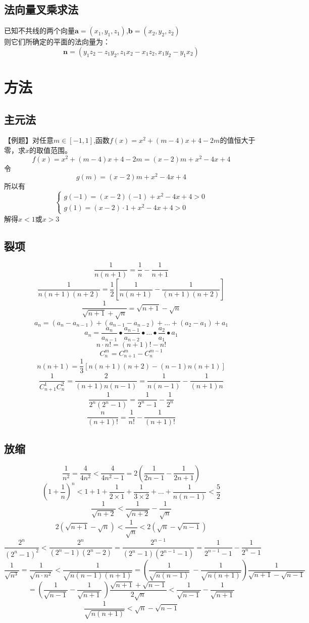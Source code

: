 \documentclass[UTF8]{ctexart}
\begin{document}
		\subsection{法向量叉乘求法}
			已知不共线的两个向量$\boldsymbol{a}=(x_1,y_1,z_1)$,$\boldsymbol{b}=(x_2,y_2,z_2)$\\
			则它们所确定的平面的法向量为：
			\[\boldsymbol{n}=(y_1 z_2-z_1 y_2,z_1 x_2-x_1 z_2,x_1 y_2-y_1 x_2)\]
	\section{方法}
		\subsection{主元法}
			【例题】对任意$m\in [-1,1]$,函数$f(x)=x^2+(m-4)x+4-2m$的值恒大于零，求$x$的取值范围。\\
			\[f(x)=x^2+(m-4)x+4-2m=(x-2)m+x^2-4x+4\]
			令
			\[g(m)=(x-2)m+x^2-4x+4\]
			所以有
			\[\begin{cases}
				g(-1)=(x-2)(-1)+x^2-4x+4>0
				\\
				g(1)=(x-2)\cdot 1+x^2-4x+4>0
			\end{cases}\]
			解得$x<1 $或$ x>3$
		\subsection{裂项}
			\[\frac{1}{n(n+1)}=\frac{1}{n}-\frac{1}{n+1}\]
			\[\frac{1}{n(n+1)(n+2)}=\frac{1}{2}\left[\frac{1}{n(n+1)}-\frac{1}{(n+1)(n+2)}\right] \]
			\[\frac{1}{\sqrt{n+1}+\sqrt{n}}=\sqrt{n+1}-\sqrt{n}\]
			\[a_n=(a_n-a_{n-1})+(a_{n-1}-a_{n-2})+\dots+(a_2-a_1)+a_1\]
			\[a_n=\frac{a_n}{a_{n-1}}\bullet\frac{a_{n-1}}{a_{n-2}}\bullet\dots\bullet\frac{a_2}{a_1}\bullet a_1\]
			\[n\cdot n!=(n+1)!-n!\]
			\[C^{m}_{n}=C^{m}_{n+1}-C^{m-1}_{n}\]
			\[n(n+1)=\frac{1}{3}\left[n(n+1)(n+2)-(n-1)n(n+1)\right]\]
			\[\frac{1}{C^{1}_{n+1}C^{2}_{n}}=\frac{2}{(n+1)n(n-1)}=\frac{1}{n(n-1)}-\frac{1}{(n+1)n}\]
			\[\frac{1}{2^n(2^n-1)}=\frac{1}{2^n-1}-\frac{1}{2^n}\]
			\[\frac{n}{(n+1)!}=\frac{1}{n!}-\frac{1}{(n+1)!}\]
		\subsection{放缩}
			\[\frac{1}{n^2}=\frac{4}{4n^2}<\frac{4}{4n^2 -1}=2\left(\frac{1}{2n-1}-\frac{1}{2n+1}\right)\]
			\[\left(1+\frac{1}{n}\right)^n<1+1+\frac{1}{2\times 1}+\frac{1}{3\times 2}+\dots+\frac{1}{n(n-1)}<\frac{5}{2}\]
			\[\frac{1}{\sqrt{n+2}}<\frac{1}{\sqrt{n+2}}-\frac{1}{\sqrt{n}}\]
			\[2(\sqrt{n+1}-\sqrt{n})<\frac{1}{\sqrt{n}}<2(\sqrt{n}-\sqrt{n-1})\]
			\[\frac{2^n}{(2^n-1)^2}<\frac{2^n}{(2^n-1)(2^n-2)}=\frac{2^{n-1}}{(2^n-1)(2^{n-1}-1)}=\frac{1}{2^{n-1}-1}-\frac{1}{2^n-1}\]
			\[\frac{1}{\sqrt{n^3}}=\frac{1}{\sqrt{n\cdot n^2}}<\frac{1}{\sqrt{n(n-1)(n+1)}}=\left(\frac{1}{\sqrt{n(n-1)}}\
				-\frac{1}{\sqrt{n(n+1)}}\right)\frac{1}{\sqrt{n+1}-\sqrt{n-1}}\]
				\[=\left(\frac{1}{\sqrt{n-1}}-\frac{1}{\sqrt{n+1}}\
				\right)\frac{\sqrt{n+1}+\sqrt{n-1}}{2\sqrt{n}}<\frac{1}{\sqrt{n-1}}-\frac{1}{\sqrt{n+1}}\]
			\[\frac{1}{\sqrt{n(n+1)}}<\sqrt{n}-\sqrt{n-1}\]
\end{document}
